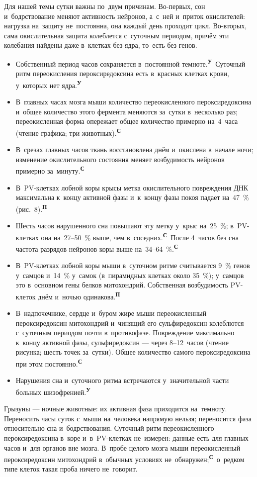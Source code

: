 \documentclass[11pt,a4paper,landscape,twocolumn]{article}
\newcommand{\tU}{\textsuperscript{\sffamily\bfseries\color{cM}У}}
\newcommand{\tS}{\textsuperscript{\sffamily\bfseries\color{cB}С}}
\newcommand{\tP}{\textsuperscript{\sffamily\bfseries\color{cA}П}}
\newcommand{\facts}{\par\vspace{3pt}{\sffamily\bfseries\small\color{cM}Опорные факты}\par\vspace{-2pt}}
\begin{document}
Для нашей темы сутки важны по~двум причинам. Во-первых, сон и~бодрствование меняют активность нейронов, а~с~ней и~приток окислителей: нагрузка на~защиту не~постоянна, она каждый день проходит цикл. Во-вторых, сама окислительная защита колеблется с~суточным периодом, причём эти колебания найдены даже в~клетках без ядра, то~есть без генов.
\facts
\begin{itemize}
\item Собственный период часов сохраняется в~постоянной темноте.\tU\ Суточный ритм переокисления пероксиредоксина есть в~красных клетках крови, у~которых нет ядра.\tU
\item В~главных часах мозга мыши количество переокисленного пероксиредоксина и~общее количество этого фермента меняются за~сутки в~несколько раз; переокисленная форма опережает общее количество примерно на~4~часа (чтение графика; три животных).\tS
\item В~срезах главных часов ткань восстановлена днём и~окислена в~начале ночи; изменение окислительного состояния меняет возбудимость нейронов примерно за~минуту.\tS
\item В~PV-клетках лобной коры крысы метка окислительного повреждения ДНК максимальна к~концу активной фазы и~к~концу фазы покоя падает на~47~\% (рис.~8).\tP
\item Шесть часов нарушенного сна повышают эту метку у~крыс на~25~\%; в~PV-клетках она на~27–50~\% выше, чем в~соседних.\tS\ После 4~часов без сна частота разрядов нейронов коры выше на~34–64~\%.\tS
\item В~PV-клетках лобной коры мыши в~суточном ритме считывается 9~\% генов у~самцов и~14~\% у~самок (в~пирамидных клетках около 35~\%); у~самцов это в~основном гены белков митохондрий. Собственная возбудимость PV-клеток днём и~ночью одинакова.\tP
\item В~надпочечнике, сердце и~буром жире мыши переокисленный пероксиредоксин митохондрий и~чинящий его сульфиредоксин колеблются с~суточным периодом почти в~противофазе. Повреждение максимально к~концу активной фазы, сульфиредоксин — через 8–12~часов (чтение рисунка; шесть точек за~сутки). Общее количество самого пероксиредоксина при этом постоянно.\tS
\item Нарушения сна и~суточного ритма встречаются у~значительной части больных шизофренией.\tU
\end{itemize}
\begin{note}
Грызуны — ночные животные: их активная фаза приходится на~темноту. Переносить часы суток с~мыши на~человека напрямую нельзя; переносится фаза относительно сна и~бодрствования. Суточный ритм переокисленного пероксиредоксина в~коре и~в~PV-клетках не~измерен: данные есть для главных часов и~для органов вне мозга. В~пробе целого мозга мыши переокисленный пероксиредоксин митохондрий в~обычных условиях не~обнаружен;\tS\ о~редком типе клеток такая проба ничего не~говорит.
\end{note}
\end{document}
